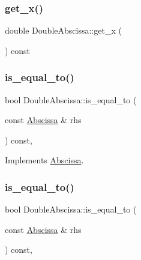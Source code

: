 \subsubsection{\texorpdfstring{get\_x()}{get\_x()}\hspace{0.1cm}{\footnotesize\ttfamily [2/2]}}
{\footnotesize\ttfamily double Double\+Abscissa\+::get\+\_\+x (\begin{DoxyParamCaption}{ }\end{DoxyParamCaption}) const\hspace{0.3cm}{\ttfamily [inline]}}

\mbox{\label{classDoubleAbscissa_ac62533c5fa000e272ad818c0afe7f02b}} 
\subsubsection{\texorpdfstring{is\_equal\_to()}{is\_equal\_to()}\hspace{0.1cm}{\footnotesize\ttfamily [1/2]}}
{\footnotesize\ttfamily bool Double\+Abscissa\+::is\+\_\+equal\+\_\+to (\begin{DoxyParamCaption}\item[{const \mbox{\hyperlink{classAbscissa}{Abscissa}} \&}]{rhs }\end{DoxyParamCaption}) const\hspace{0.3cm}{\ttfamily [inline]}, {\ttfamily [virtual]}}



Implements \mbox{\hyperlink{classAbscissa_a4adf4055c1eee010f9493e0ebb66348a}{Abscissa}}.

\mbox{\label{classDoubleAbscissa_ac62533c5fa000e272ad818c0afe7f02b}} 
\subsubsection{\texorpdfstring{is\_equal\_to()}{is\_equal\_to()}\hspace{0.1cm}{\footnotesize\ttfamily [2/2]}}
{\footnotesize\ttfamily bool Double\+Abscissa\+::is\+\_\+equal\+\_\+to (\begin{DoxyParamCaption}\item[{const \mbox{\hyperlink{classAbscissa}{Abscissa}} \&}]{rhs }\end{DoxyParamCaption}) const\hspace{0.3cm}{\ttfamily [inline]}, {\ttfamily [virtual]}}



